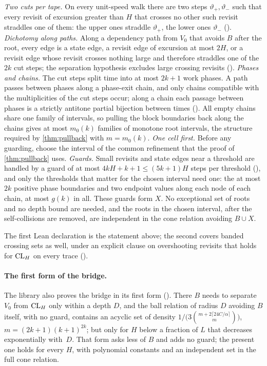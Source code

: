 \begin{outline}
\emph{Two cuts per tape.} On every unit-speed walk there are two steps $\vartheta_+,\vartheta_-$ such that every revisit of
excursion greater than $H$ that crosses no other such revisit straddles one of them: the upper ones straddle $\vartheta_+$, the
lower ones $\vartheta_-$ (). \emph{Dichotomy along paths.} Along a dependency
path from $V_0$ that avoids $B$ after the root, every edge is a state edge, a revisit edge of excursion at most $2H$, or a revisit
edge whose revisit crosses nothing large and therefore straddles one of the $2k$ cut steps; the separation hypothesis excludes
large crossing revisits (). \emph{Phases and chains.}
The cut steps split time into at most $2k+1$ work phases. A path passes between phases along a phase-exit chain, and only chains
compatible with the multiplicities of the cut steps occur; along a chain each passage between phases is a strictly antitone partial
bijection between times (). All empty chains share one family of intervals, so pulling the
block boundaries back along the chains gives at most $m_0(k)$ families of monotone root intervals, the structure required by
\cref{thm:pullback} with $m=m_0(k)$. \emph{One cell first.} Before any guarding, choose the interval of the common refinement that
the proof of \cref{thm:pullback} uses. \emph{Guards.} Small revisits and state edges near a threshold are handled by a guard of at
most $4kH+k+1\le(5k+1)H$ steps per threshold (), and only the thresholds that matter for the chosen interval
need one: the at most $2k$ positive phase boundaries and two endpoint values along each node of each chain, at most $g(k)$ in all.
These guards form $X$. No exceptional set of roots and no depth bound are needed, and the roots in the chosen interval, after the
self-collisions are removed, are independent in the cone relation avoiding $B\cup X$.
\end{outline}

The first Lean declaration is the statement above; the second covers banded crossing sets as well, under an explicit clause on
overshooting revisits that holds for $\mathrm{CL}_H$ on every trace ().

\paragraph{The first form of the bridge.} The library also proves the bridge in its first form (). There $B$ needs
to separate $V_0$ from $\mathrm{CL}_H$ only within a depth $D$, and the ball relation of radius $D$ avoiding $B$ itself, with no guard,
contains an acyclic set of density $1/\bigl(3\binom{m+2\lceil24C/\alpha\rceil}{m}\bigr)$, $m=(2k+1)(k+1)^{2k}$; but only for $H$ below a
fraction of $L$ that decreases exponentially with~$D$. That form asks less of $B$ and adds no guard; the present one holds for every
$H$, with polynomial constants and an independent set in the full cone relation.


